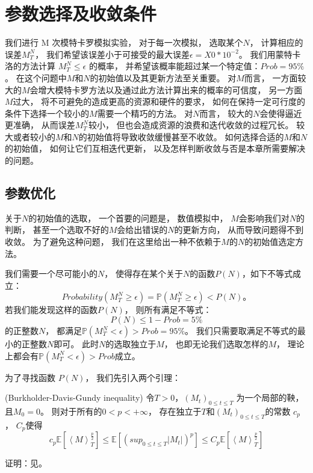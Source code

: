 \chapter{参数选择及收敛条件}
\label{chp:3}
我们进行 M 次模特卡罗模拟实验， 对于每一次模拟， 选取某个$N$， 计算相应的误差$M_T^N$， 我们希望该误差小于可接受的最大误差$\epsilon=X0*10^{-2}$。 
我们用蒙特卡洛的方法计算 $M_T^N\leq \epsilon$ 的概率， 并希望该概率能超过某一个特定值：$Prob=95\%$。 
在这个问题中$M$和$N$的初始值以及其更新方法至关重要。 对$M$而言， 一方面较大的$M$会增大模特卡罗方法以及通过此方法计算出来的概率的可信度， 另一方面
$M$过大， 将不可避免的造成更高的资源和硬件的要求， 如何在保持一定可行度的条件下选择一个较小的$M$需要一个精巧的方法。
对$N$而言， 较大的$N$会使得逼近更准确， 从而误差$M_T^N$较小， 但也会造成资源的浪费和迭代收敛的过程冗长。
较大或者较小的$M$和$N$的初始值将导致收敛缓慢甚至不收敛。
如何选择合适的$M$和$N$的初始值，
如何让它们互相迭代更新， 以及怎样判断收敛与否是本章所需要解决的问题。
\section{参数优化} %
\label{sec:N}
关于$N$的初始值的选取， 一个首要的问题是， 数值模拟中， $M$会影响我们对$N$的判断， 甚至一个选取不好的$M$会给出错误的$N$的更新方向，
从而导致问题得不到收敛。 为了避免这种问题， 我们在这里给出一种不依赖于$M$的$N$的初始值选定方法。

我们需要一个尽可能小的$N$， 使得存在某个关于$N$的函数$P(N)$，如下不等式成立：
\begin{equation}
Probability(M_T^N\geq\epsilon)=\mathbb{P}(M_T^N\geq\epsilon)<P(N)。
\end{equation}
若我们能发现这样的函数$P(N)$， 则所有满足不等式：
\begin{equation}
P(N)\leq 1-Prob=5\% 
\end{equation}
的正整数$N$， 都满足$\mathbb{P}(M_T^N<\epsilon)>Prob=95\%$。
我们只需要取满足不等式的最小的正整数$N$即可。 此时$N$的选取独立于$M$， 也即无论我们选取怎样的$M$， 理论上都会有$\mathbb{P}(M_T^N<\epsilon)>Prob$成立。

为了寻找函数 $P(N)$， 我们先引入两个引理：
\begin{lemma}{(Burkholder-Davis-Gundy inequality)}
令$T>0$，$(M_t)_{0\leq t\leq T}$ 为一个局部的鞅， 且$M_0=0$。 则对于所有的$0<p<+\infty$， 存在独立于$T$和$(M_t)_{0\leq t\leq T}$的常数
$c_p$， $C_p$使得 
\begin{equation}
c_p\mathbb{E}[\left \langle M \right \rangle_T^{\frac{p}{2}}]\leq \mathbb{E}[(sup_{0\leq t\leq T}|M_t|)^p]\leq C_p\mathbb{E}[\left \langle M \right \rangle_T^{\frac{p}{2}}]
\end{equation}
\end{lemma}
证明：见\cite{MouvementBrownien}。

